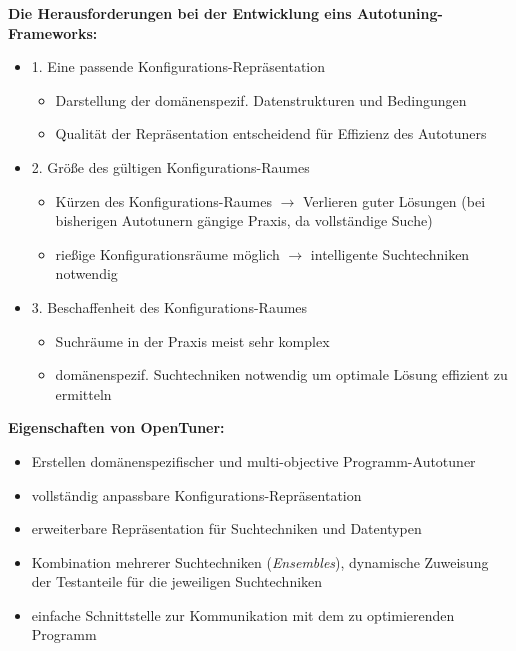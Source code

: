     \begin{frame}
    
    \textbf{Die Herausforderungen bei der Entwicklung eins Autotuning-Frameworks:}
    
    \begin{itemize}
       
    \item 1. Eine passende Konfigurations-Repräsentation
        \begin{itemize}
          \item Darstellung der domänenspezif. Datenstrukturen und Bedingungen
          \item Qualität der Repräsentation entscheidend für Effizienz des Autotuners \newline
        \end{itemize}
        
    \item 2. Größe des gültigen Konfigurations-Raumes
        \begin{itemize}
          \item Kürzen des Konfigurations-Raumes $\rightarrow$ Verlieren guter Lösungen
          (bei bisherigen Autotunern gängige Praxis, da vollständige Suche)
          \item rießige Konfigurationsräume möglich $\rightarrow$  intelligente Suchtechniken notwendig \newline
        \end{itemize}
        
    \item 3. Beschaffenheit des Konfigurations-Raumes
      \begin{itemize}
        \item Suchräume in der Praxis meist sehr komplex 
        \item domänenspezif. Suchtechniken notwendig um optimale Lösung effizient zu ermitteln
      \end{itemize}
    \end{itemize}
        
    \end{frame}
    

    \begin{frame}
    
    \textbf{Eigenschaften von OpenTuner:}   
    \begin{itemize}
      \item Erstellen domänenspezifischer und multi-objective Programm-Autotuner
      \item vollständig anpassbare Konfigurations-Repräsentation
      \item erweiterbare Repräsentation für Suchtechniken und Datentypen
      \item Kombination mehrerer Suchtechniken (\textit{Ensembles}), dynamische Zuweisung der
      Testanteile für die jeweiligen Suchtechniken
      \item einfache Schnittstelle zur Kommunikation mit dem zu optimierenden Programm           
    \end{itemize}
    \end{frame}

